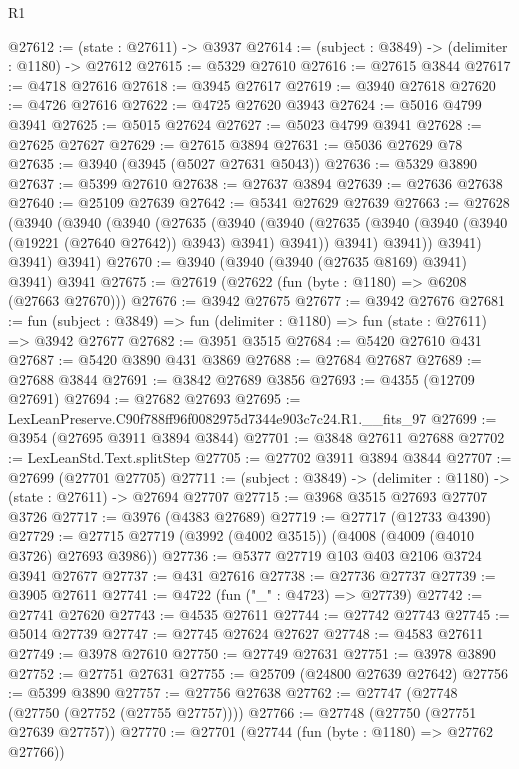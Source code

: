 \begin{lexlean}{R1}
\begin{coremodule}
@27612 := (state : @27611) -> @3937
@27614 := (subject : @3849) -> (delimiter : @1180) -> @27612
@27615 := @5329 @27610
@27616 := @27615 @3844
@27617 := @4718 @27616
@27618 := @3945 @27617
@27619 := @3940 @27618
@27620 := @4726 @27616
@27622 := @4725 @27620 @3943
@27624 := @5016 @4799 @3941
@27625 := @5015 @27624
@27627 := @5023 @4799 @3941
@27628 := @27625 @27627
@27629 := @27615 @3894
@27631 := @5036 @27629 @78
@27635 := @3940 (@3945 (@5027 @27631 @5043))
@27636 := @5329 @3890
@27637 := @5399 @27610
@27638 := @27637 @3894
@27639 := @27636 @27638
@27640 := @25109 @27639
@27642 := @5341 @27629 @27639
@27663 := @27628
    (@3940
      (@3940
        (@3940
          (@27635
            (@3940
              (@3940
                (@27635 (@3940 (@3940 (@3940 (@19221 (@27640 @27642)) @3943) @3941) @3941))
                @3941)
              @3941))
          @3941)
        @3941)
      @3941)
@27670 := @3940 (@3940 (@3940 (@27635 @8169) @3941) @3941) @3941
@27675 := @27619 (@27622 (fun (byte : @1180) => @6208 (@27663 @27670)))
@27676 := @3942 @27675
@27677 := @3942 @27676
@27681 := fun (subject : @3849) => fun (delimiter : @1180) => fun (state : @27611) => @3942 @27677
@27682 := @3951 @3515
@27684 := @5420 @27610 @431
@27687 := @5420 @3890 @431 @3869
@27688 := @27684 @27687
@27689 := @27688 @3844
@27691 := @3842 @27689 @3856
@27693 := @4355 (@12709 @27691)
@27694 := @27682 @27693
@27695 := LexLeanPreserve.C90f788ff96f0082975d7344e903c7c24.R1.__fits_97
@27699 := @3954 (@27695 @3911 @3894 @3844)
@27701 := @3848 @27611 @27688
@27702 := LexLeanStd.Text.splitStep
@27705 := @27702 @3911 @3894 @3844
@27707 := @27699 (@27701 @27705)
@27711 := (subject : @3849) -> (delimiter : @1180) -> (state : @27611) -> @27694 @27707
@27715 := @3968 @3515 @27693 @27707 @3726
@27717 := @3976 (@4383 @27689)
@27719 := @27717 (@12733 @4390)
@27729 := @27715 @27719 (@3992 (@4002 @3515)) (@4008 (@4009 (@4010 @3726) @27693 @3986))
@27736 := @5377 @27719 @103 @403 @2106 @3724 @3941 @27677
@27737 := @431 @27616
@27738 := @27736 @27737
@27739 := @3905 @27611
@27741 := @4722 (fun ("_" : @4723) => @27739)
@27742 := @27741 @27620
@27743 := @4535 @27611
@27744 := @27742 @27743
@27745 := @5014 @27739
@27747 := @27745 @27624 @27627
@27748 := @4583 @27611
@27749 := @3978 @27610
@27750 := @27749 @27631
@27751 := @3978 @3890
@27752 := @27751 @27631
@27755 := @25709 (@24800 @27639 @27642)
@27756 := @5399 @3890
@27757 := @27756 @27638
@27762 := @27747 (@27748 (@27750 (@27752 (@27755 @27757))))
@27766 := @27748 (@27750 (@27751 @27639 @27757))
@27770 := @27701 (@27744 (fun (byte : @1180) => @27762 @27766))

\end{coremodule}
\end{lexlean}
